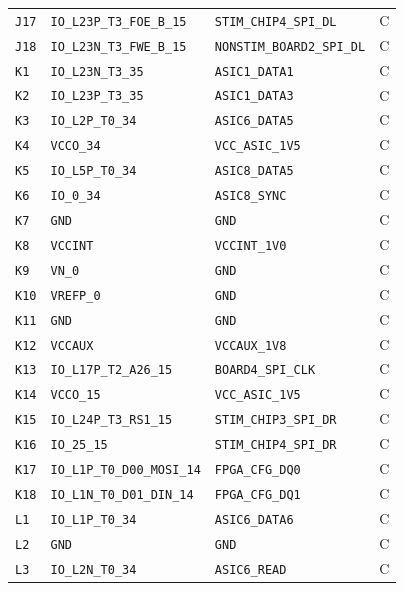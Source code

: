 \documentclass[10pt,a4paper]{article}
\begin{document}
\begin{longtable}{@{}P{15mm}P{42mm}P{92mm}P{10mm}@{}}
\nolinkurl{J17} & \nolinkurl{IO_L23P_T3_FOE_B_15} & \nolinkurl{STIM_CHIP4_SPI_DL} & C \\
\nolinkurl{J18} & \nolinkurl{IO_L23N_T3_FWE_B_15} & \nolinkurl{NONSTIM_BOARD2_SPI_DL} & C \\
\nolinkurl{K1} & \nolinkurl{IO_L23N_T3_35} & \nolinkurl{ASIC1_DATA1} & C \\
\nolinkurl{K2} & \nolinkurl{IO_L23P_T3_35} & \nolinkurl{ASIC1_DATA3} & C \\
\nolinkurl{K3} & \nolinkurl{IO_L2P_T0_34} & \nolinkurl{ASIC6_DATA5} & C \\
\nolinkurl{K4} & \nolinkurl{VCCO_34} & \nolinkurl{VCC_ASIC_1V5} & C \\
\nolinkurl{K5} & \nolinkurl{IO_L5P_T0_34} & \nolinkurl{ASIC8_DATA5} & C \\
\nolinkurl{K6} & \nolinkurl{IO_0_34} & \nolinkurl{ASIC8_SYNC} & C \\
\nolinkurl{K7} & \nolinkurl{GND} & \nolinkurl{GND} & C \\
\nolinkurl{K8} & \nolinkurl{VCCINT} & \nolinkurl{VCCINT_1V0} & C \\
\nolinkurl{K9} & \nolinkurl{VN_0} & \nolinkurl{GND} & C \\
\nolinkurl{K10} & \nolinkurl{VREFP_0} & \nolinkurl{GND} & C \\
\nolinkurl{K11} & \nolinkurl{GND} & \nolinkurl{GND} & C \\
\nolinkurl{K12} & \nolinkurl{VCCAUX} & \nolinkurl{VCCAUX_1V8} & C \\
\nolinkurl{K13} & \nolinkurl{IO_L17P_T2_A26_15} & \nolinkurl{BOARD4_SPI_CLK} & C \\
\nolinkurl{K14} & \nolinkurl{VCCO_15} & \nolinkurl{VCC_ASIC_1V5} & C \\
\nolinkurl{K15} & \nolinkurl{IO_L24P_T3_RS1_15} & \nolinkurl{STIM_CHIP3_SPI_DR} & C \\
\nolinkurl{K16} & \nolinkurl{IO_25_15} & \nolinkurl{STIM_CHIP4_SPI_DR} & C \\
\nolinkurl{K17} & \nolinkurl{IO_L1P_T0_D00_MOSI_14} & \nolinkurl{FPGA_CFG_DQ0} & C \\
\nolinkurl{K18} & \nolinkurl{IO_L1N_T0_D01_DIN_14} & \nolinkurl{FPGA_CFG_DQ1} & C \\
\nolinkurl{L1} & \nolinkurl{IO_L1P_T0_34} & \nolinkurl{ASIC6_DATA6} & C \\
\nolinkurl{L2} & \nolinkurl{GND} & \nolinkurl{GND} & C \\
\nolinkurl{L3} & \nolinkurl{IO_L2N_T0_34} & \nolinkurl{ASIC6_READ} & C \\

\end{longtable}
\end{document}
